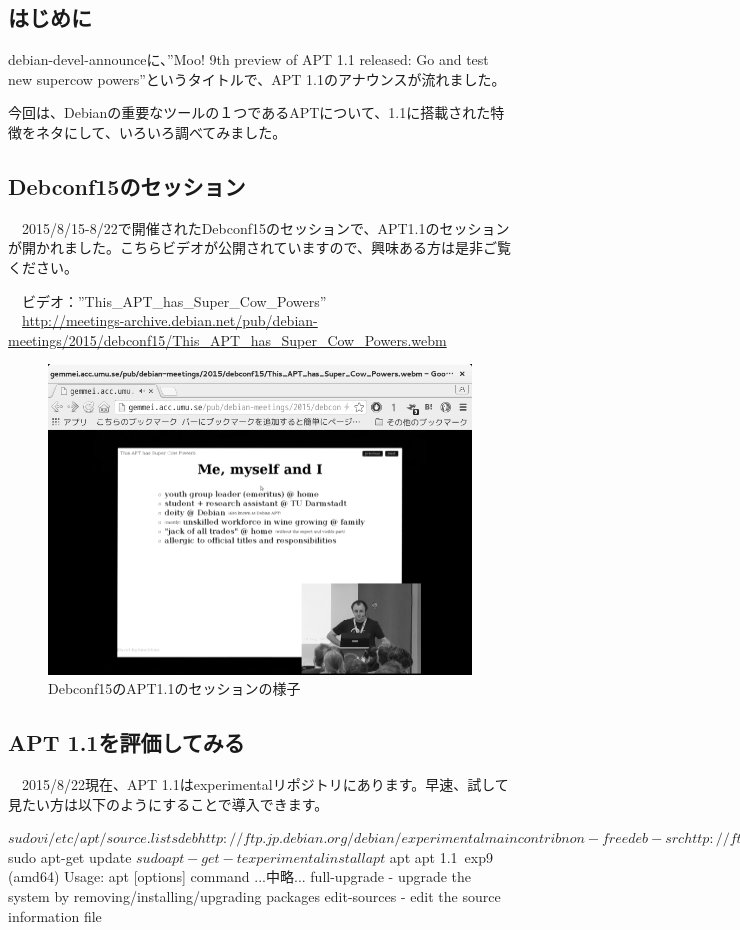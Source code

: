 \documentclass[mingoth,a4paper]{jsarticle}
\begin{document}
\subsection{はじめに}

 debian-devel-announceに、''Moo! 9th preview of APT 1.1 released: Go and test new supercow powers''というタイトルで、APT 1.1のアナウンスが流れました。

 今回は、Debianの重要なツールの１つであるAPTについて、1.1に搭載された特徴をネタにして、いろいろ調べてみました。

\subsection{Debconf15のセッション}

　2015/8/15-8/22で開催されたDebconf15のセッションで、APT1.1のセッションが開かれました。こちらビデオが公開されていますので、興味ある方は是非ご覧ください。

　ビデオ：''This\_APT\_has\_Super\_Cow\_Powers''\\
　\url{http://meetings-archive.debian.net/pub/debian-meetings/2015/debconf15/This_APT_has_Super_Cow_Powers.webm}

\begin{figure}[H]
\begin{center}
 \includegraphics[width=0.5\hsize]{image201508/debconf15-apt_mono.png}
\end{center}
\caption{Debconf15のAPT1.1のセッションの様子}
\end{figure}

\subsection{APT 1.1を評価してみる}

　2015/8/22現在、APT 1.1はexperimentalリポジトリにあります。早速、試して見たい方は以下のようにすることで導入できます。

\begin{commandline}
$ sudo vi /etc/apt/source.lists
deb http://ftp.jp.debian.org/debian/ experimental main contrib non-free
deb-src http://ftp.jp.debian.org/debian/ experimental main contrib non-free
$ sudo apt-get update
$ sudo apt-get -t experimental install apt
$ apt
apt 1.1~exp9 (amd64)
Usage: apt [options] command
...中略...
 full-upgrade - upgrade the system by removing/installing/upgrading packages
 edit-sources - edit the source information file
\end{commandline}
\end{document}
